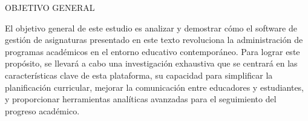 















OBJETIVO GENERAL

El objetivo general de este estudio es analizar y demostrar cómo el software de gestión de asignaturas presentado en este texto
revoluciona la administración de programas académicos en el entorno educativo contemporáneo. Para lograr este propósito, se llevará a cabo una investigación exhaustiva que se centrará en las características clave de esta plataforma, su capacidad para simplificar la planificación curricular, mejorar la comunicación entre educadores y estudiantes, y proporcionar herramientas analíticas avanzadas para el seguimiento del progreso académico.
